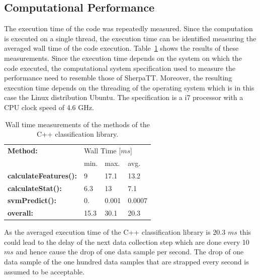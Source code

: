 \documentclass{article}
\begin{document}


\subsection{Computational Performance}

The execution time of the code was repeatedly measured. Since the computation is executed on a single thread, the execution time can be identified measuring the averaged wall time of the code execution. Table~\ref{table:compmeasurments} shows the results of these measurements. Since the execution time depends on the system on which the code executed, the computational system specification used to measure the performance need to resemble those of SherpaTT. Moreover, the resulting execution time depends
on the threading of the operating system which is in this case the Linux distribution Ubuntu. The specification is a i7 processor with a CPU clock speed of 4.6 GHz. 

\begin{table}[!htb]
   \centering
    \begin{tabularx}{\columnwidth}{X|XXX}
        \textbf{Method:} & \multicolumn{3}{X}{Wall Time [$ms$]} \\
        &min.&max.&avg.\\
        \hline
        \hline
        \textbf{calculateFeatures():} & 9&  17.1& 13.2 \\
        \textbf{calculateStat():}     & 6.3 & 13 & 7.1 \\
        \textbf{svmPredict():}        &  0. &  0.001 & 0.0007  \\
        \hline
        \textbf{overall:}             & 15.3 & 30.1 &20.3  \\
    \end{tabularx}	
    \caption{Wall time measurements of the methods of the C++ classification library.}
    \label{table:compmeasurments}
\end{table}

As the averaged execution time of the C++ classification library is 20.3 $ms$ this could lead to the delay of the next data collection step which are done every 10 $ms$ and hence cause the drop of one data sample per second. The drop of one data sample of the one hundred data samples that are strapped every second is assumed to be acceptable.
\end{document}
